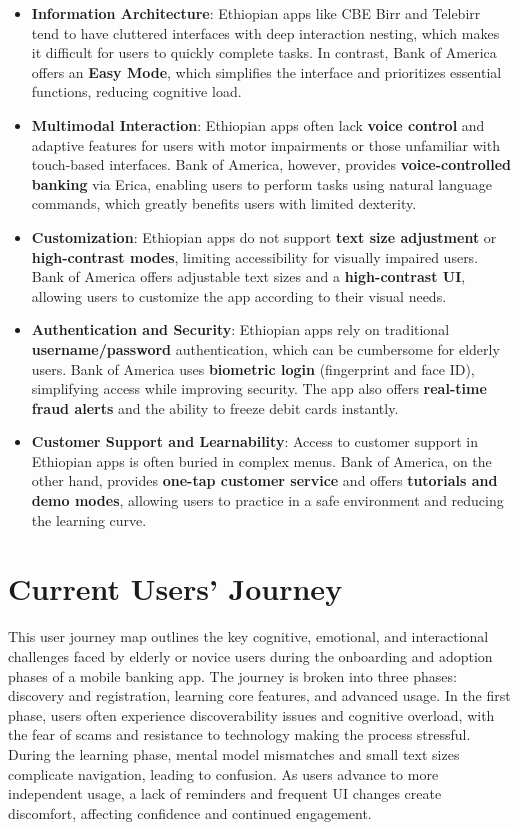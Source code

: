 \documentclass[a4paper,12pt]{report}
\begin{document}
\begin{itemize}[label=--]
  \item \textbf{Information Architecture}:
        Ethiopian apps like CBE Birr and Telebirr tend to have cluttered interfaces with deep interaction nesting, which makes it difficult for users to quickly complete tasks. In contrast, Bank of America offers an \textbf{Easy Mode}, which simplifies the interface and prioritizes essential functions, reducing cognitive load.

  \item \textbf{Multimodal Interaction}:
        Ethiopian apps often lack \textbf{voice control} and adaptive features for users with motor impairments or those unfamiliar with touch-based interfaces. Bank of America, however, provides \textbf{voice-controlled banking} via Erica, enabling users to perform tasks using natural language commands, which greatly benefits users with limited dexterity.

  \item \textbf{Customization}:
        Ethiopian apps do not support \textbf{text size adjustment} or \textbf{high-contrast modes}, limiting accessibility for visually impaired users. Bank of America offers adjustable text sizes and a \textbf{high-contrast UI}, allowing users to customize the app according to their visual needs.

  \item \textbf{Authentication and Security}:
        Ethiopian apps rely on traditional \textbf{username/password} authentication, which can be cumbersome for elderly users. Bank of America uses \textbf{biometric login} (fingerprint and face ID), simplifying access while improving security. The app also offers \textbf{real-time fraud alerts} and the ability to freeze debit cards instantly.

  \item \textbf{Customer Support and Learnability}:
        Access to customer support in Ethiopian apps is often buried in complex menus. Bank of America, on the other hand, provides \textbf{one-tap customer service} and offers \textbf{tutorials and demo modes}, allowing users to practice in a safe environment and reducing the learning curve.
\end{itemize}

\section{Current Users' Journey}
This user journey map outlines the key cognitive, emotional, and interactional challenges faced by elderly or novice users during the onboarding and adoption phases of a mobile banking app. The journey is broken into three phases: discovery and registration, learning core features, and advanced usage. In the first phase, users often experience discoverability issues and cognitive overload, with the fear of scams and resistance to technology making the process stressful. During the learning phase, mental model mismatches and small text sizes complicate navigation, leading to confusion. As users advance to more independent usage, a lack of reminders and frequent UI changes create discomfort, affecting confidence and continued engagement.
\end{document}

